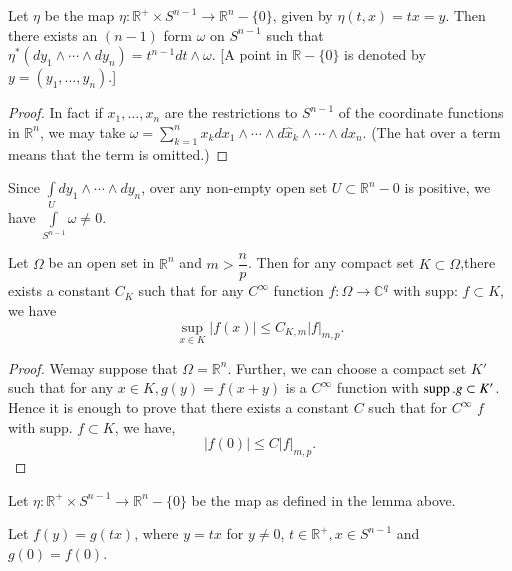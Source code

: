 \begin{lemma}\label{chap3:sec5:lem3} %
  Let $\eta$ be the map $\eta : \mathbb{R}^+ \times S^{n-1} \to
  \mathbb{R}^n - \{0\}$, given by $\eta (t, x) = tx = y$. Then there
  exists an $(n - 1)$ form $\omega $ on $S^{n-1}$ such that $\eta ^*
  (dy_1 \wedge \cdots \wedge dy_n) = t^{n-1} dt \wedge \omega$. [A
    point in $\mathbb{R}- \{0\}$ is denoted by $y = (y_1, \ldots ,
    y_n)$.] 
\end{lemma}

\begin{proof}
  In fact if $x_1, \ldots , x_n$ are the restrictions to $S^{n-1}$ of
  the coordinate functions in $\mathbb{R}^n$, we may take $\omega =
  \sum\limits_{k = 1}^n x_k dx_1 \wedge \cdots \wedge d\hat{x}_k
  \wedge \cdots \wedge dx_n$. (The hat over a term means that the term
  is omitted.) 
\end{proof}

\begin{remark*} %
  Since $\int\limits_U dy _1 \wedge \cdots \wedge dy_n$, over any
  non-empty open set  $U \subset \mathbb{R}^n - 0$ is positive, we
  have $\int\limits_{S^{n-1}} \omega \neq 0$. 
\end{remark*}

\begin{theorem}\label{chap3:sec5:thm2}%
  Let $\Omega$ be an open set in $\mathbb{R}^n$ and $m >
  \dfrac{n}{p}$. Then for any compact set $K \subset \Omega$,there
  exists a constant $C_K$ such that for any $C^\infty$ function $f :
  \Omega \to \mathbb{C}^q$ with supp: $f \subset K$, we have 
  $$
  \sup\limits_{x \in K} | f(x) | \le C_{K, m} | f |_{m, p}.
  $$
\end{theorem}

\begin{proof}
  We\pageoriginale may suppose that $\Omega = \mathbb{R}^n$. Further, we can choose
  a compact set $K'$ such that for any $x \in K, g(y) = f(x+y)$ is a
  $C^\infty$ function with $\operatorname{supp}. g \subset K'$. Hence it is enough to
  prove that there exists a constant $C$ such that for $C^\infty$ $f$
  with supp. $f \subset K$, we have, 
  $$
  | f(0) | \le C | f |_{m, p}.
  $$ 
\end{proof}

Let $\eta : \mathbb{R}^+ \times S^{n-1} \to \mathbb{R}^n - \{0\}$ be the map
as defined in the lemma above. 

Let $f(y) = g(tx)$, where $y = tx $ for $ y \neq 0$, $t \in
\mathbb{R}^+, x \in S^{n-1} $ and $g(0) = f(0)$. 

